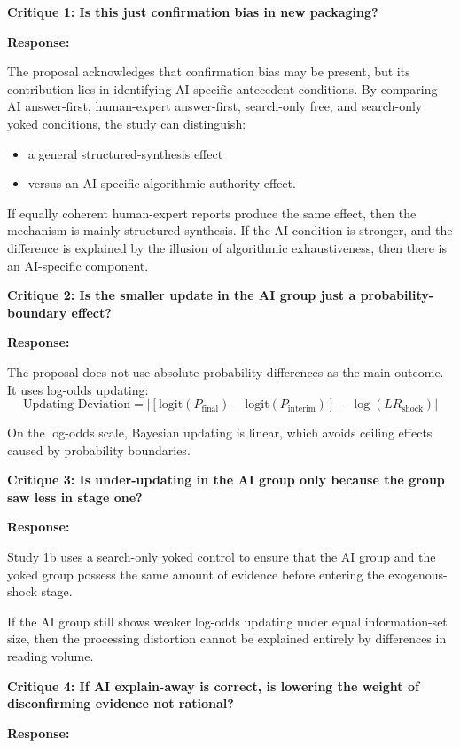 \textbf{Critique 1: Is this just confirmation bias in new packaging?}

\textbf{Response:}

The proposal acknowledges that confirmation bias may be present, but its contribution lies in identifying AI-specific antecedent conditions. By comparing AI answer-first, human-expert answer-first, search-only free, and search-only yoked conditions, the study can distinguish:
\begin{itemize}[leftmargin=1.5em]
\item a general structured-synthesis effect
\item versus an AI-specific algorithmic-authority effect.
\end{itemize}

If equally coherent human-expert reports produce the same effect, then the mechanism is mainly structured synthesis. If the AI condition is stronger, and the difference is explained by the illusion of algorithmic exhaustiveness, then there is an AI-specific component.

\textbf{Critique 2: Is the smaller update in the AI group just a probability-boundary effect?}

\textbf{Response:}

The proposal does not use absolute probability differences as the main outcome. It uses log-odds updating:
\[
\text{Updating Deviation}
=
\left|
\left[
\text{logit}(P_{\text{final}}) - \text{logit}(P_{\text{interim}})
\right]
- \log(LR_{\text{shock}})
\right|
\]

On the log-odds scale, Bayesian updating is linear, which avoids ceiling effects caused by probability boundaries.

\textbf{Critique 3: Is under-updating in the AI group only because the group saw less in stage one?}

\textbf{Response:}

Study 1b uses a search-only yoked control to ensure that the AI group and the yoked group possess the same amount of evidence before entering the exogenous-shock stage.

If the AI group still shows weaker log-odds updating under equal information-set size, then the processing distortion cannot be explained entirely by differences in reading volume.

\textbf{Critique 4: If AI explain-away is correct, is lowering the weight of disconfirming evidence not rational?}

\textbf{Response:}

